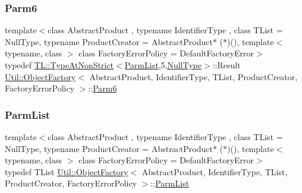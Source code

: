\subsubsection{\texorpdfstring{Parm6}{Parm6}\hspace{0.1cm}{\footnotesize\ttfamily [3/3]}}
{\footnotesize\ttfamily template$<$class Abstract\+Product , typename Identifier\+Type , class T\+List  = Null\+Type, typename Product\+Creator  = Abstract\+Product$\ast$ ($\ast$)(), template$<$ typename, class $>$ class Factory\+Error\+Policy = Default\+Factory\+Error$>$ \\
typedef \mbox{\hyperlink{structUtil_1_1TL_1_1TypeAtNonStrict}{T\+L\+::\+Type\+At\+Non\+Strict}}$<$\mbox{\hyperlink{classUtil_1_1ObjectFactory_a46f003a5928e8a60140e0a74ac261c36}{Parm\+List}},5,\mbox{\hyperlink{classUtil_1_1NullType}{Null\+Type}}$>$\+::Result \mbox{\hyperlink{classUtil_1_1ObjectFactory}{Util\+::\+Object\+Factory}}$<$ Abstract\+Product, Identifier\+Type, T\+List, Product\+Creator, Factory\+Error\+Policy $>$\+::\mbox{\hyperlink{classUtil_1_1ObjectFactory_a9f80d25e0964c0e4c204373cd651397a}{Parm6}}}

\mbox{\label{classUtil_1_1ObjectFactory_a46f003a5928e8a60140e0a74ac261c36}} 
\subsubsection{\texorpdfstring{ParmList}{ParmList}\hspace{0.1cm}{\footnotesize\ttfamily [1/3]}}
{\footnotesize\ttfamily template$<$class Abstract\+Product , typename Identifier\+Type , class T\+List  = Null\+Type, typename Product\+Creator  = Abstract\+Product$\ast$ ($\ast$)(), template$<$ typename, class $>$ class Factory\+Error\+Policy = Default\+Factory\+Error$>$ \\
typedef T\+List \mbox{\hyperlink{classUtil_1_1ObjectFactory}{Util\+::\+Object\+Factory}}$<$ Abstract\+Product, Identifier\+Type, T\+List, Product\+Creator, Factory\+Error\+Policy $>$\+::\mbox{\hyperlink{classUtil_1_1ObjectFactory_a46f003a5928e8a60140e0a74ac261c36}{Parm\+List}}}

